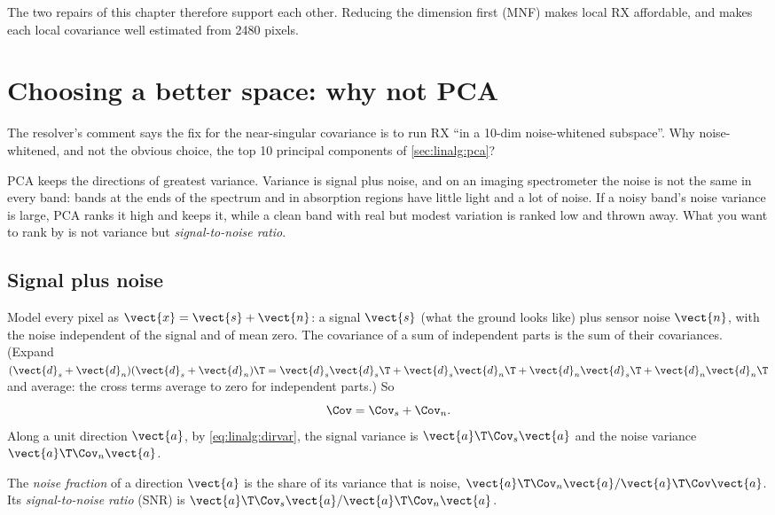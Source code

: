 The two repairs of this chapter therefore support each other. Reducing the dimension first (MNF) makes
local RX affordable, and makes each local covariance well estimated from 2480 pixels.

\section{Choosing a better space: why not PCA}\label{sec:localrx:whynotpca}

The resolver's comment says the fix for the near-singular covariance is to run RX ``in a 10-dim
noise-whitened subspace''. Why noise-whitened, and not the obvious choice, the top 10 principal
components of \cref{sec:linalg:pca}?

PCA keeps the directions of greatest variance. Variance is signal plus noise, and on an imaging
spectrometer the noise is not the same in every band: bands at the ends of the spectrum and in
absorption regions have little light and a lot of noise. If a noisy band's noise variance is large,
PCA ranks it high and keeps it, while a clean band with real but modest variation is ranked low and
thrown away. What you want to rank by is not variance but \emph{signal-to-noise ratio}.

\subsection{Signal plus noise}

Model every pixel as $\vect{x} = \vect{s} + \vect{n}$: a signal $\vect{s}$ (what the ground looks like)
plus sensor noise $\vect{n}$, with the noise independent of the signal and of mean zero. The covariance
of a sum of independent parts is the sum of their covariances. (Expand
$(\vect{d}_s + \vect{d}_n)(\vect{d}_s + \vect{d}_n)\T = \vect{d}_s\vect{d}_s\T + \vect{d}_s\vect{d}_n\T +
\vect{d}_n\vect{d}_s\T + \vect{d}_n\vect{d}_n\T$ and average: the cross terms average to zero for
independent parts.) So
\begin{equation}\label{eq:localrx:sigsum}
\Cov = \Cov_s + \Cov_n .
\end{equation}
Along a unit direction $\vect{a}$, by \cref{eq:linalg:dirvar}, the signal variance is
$\vect{a}\T\Cov_s\vect{a}$ and the noise variance $\vect{a}\T\Cov_n\vect{a}$.

\begin{definition}
The \emph{noise fraction} of a direction $\vect{a}$ is the share of its variance that is noise,
$\vect{a}\T\Cov_n\vect{a} / \vect{a}\T\Cov\vect{a}$. Its \emph{signal-to-noise ratio} (SNR) is
$\vect{a}\T\Cov_s\vect{a} / \vect{a}\T\Cov_n\vect{a}$.
\end{definition}

